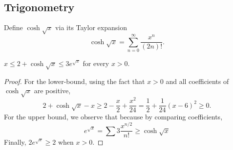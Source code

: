 \begin{definition}[Books]
  \label{def:book}
\end{definition}


\subsection{Trigonometry}


\begin{definition}
  \label{def:coshsqrt} %
  \leanok
  Define $\cosh \sqrt{x}$ via its Taylor expansion
  $$\cosh\sqrt{x} = \sum_{n = 0}^\infty \frac{x^n}{(2n)!}.$$
\end{definition}


\begin{lemma}
  \label{lem:coshsqrt-bd-pos}
  \leanok
  $x \le 2 + \cosh \sqrt{x} \le 3 e^{\sqrt{x}}$ for every $x > 0$.
\end{lemma}
%
\begin{proof}
  For the lower-bound, using the fact that $x>0$ and all coefficients of $\cosh \sqrt{x}$ are positive,
  \begin{equation*}
    2+\cosh \sqrt{x} - x \ge 2 - \frac{x}{2} + \frac{x^2}{24} = \frac{1}{2}+\frac{1}{24}(x-6)^2 \ge 0.
  \end{equation*}
  For the upper bound, we observe that because by comparing coefficients,
  \begin{equation*}
    e^{\sqrt{x}} = \sum 3\frac{x^{n/2}}{n!}  \ge \cosh\sqrt{x}
  \end{equation*}
  Finally, $2e^{\sqrt{x}}\ge 2$ when $x>0$.
\end{proof}

